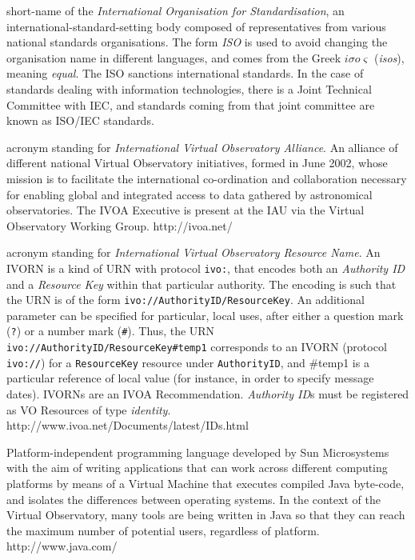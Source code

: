{
    	short-name of the \emph{International Organisation for
        Standardisation}, an international-standard-setting body
        composed of representatives from various national standards
        organisations. The form \emph{ISO} is used to avoid changing
        the organisation name in different languages, and comes from
        the Greek $i\sigma{}o\varsigma$ (\emph{isos}),
        meaning \emph{equal}. The ISO sanctions international
        standards. In the case of standards dealing with information
        technologies, there is a Joint Technical Committee with
        \gls{IEC}, and standards coming from that joint committee are
        known as ISO/IEC standards.
}

{
    	acronym standing for \emph{International Virtual Observatory
        Alliance}. An alliance of different national \gls{Virtual
        Observatory} initiatives, formed in June 2002, whose mission is
        to facilitate the international co-ordination and collaboration
        necessary for enabling global and integrated access to data
        gathered by astronomical observatories. The IVOA Executive is
        present at the \gls{IAU} via the Virtual Observatory Working
        Group. http://ivoa.net/
}

{
    	acronym standing for \emph{International Virtual Observatory
        Resource Name}. An IVORN is a kind of \gls{URN} with protocol
        \texttt{ivo:}, that encodes both an \emph{Authority ID} and a
        \emph{Resource Key} within that particular authority. The
        encoding is such that the URN is of the form
        \texttt{ivo://AuthorityID/ResourceKey}. An additional parameter
        can be specified for particular, local uses, after either a
        question mark (\texttt{?}) or a number mark (\texttt{#}). Thus,
        the URN \texttt{ivo://AuthorityID/ResourceKey#temp1}
        corresponds to an IVORN (protocol \texttt{ivo://}) for a
        \texttt{ResourceKey} resource under \texttt{AuthorityID}, and
        #temp1 is a particular reference of local value (for instance,
        in order to specify message dates). IVORNs are an \gls{IVOA
        Recommendation}. \emph{Authority ID}s must be registered as
        \gls{VO Resource}s of type \emph{identity}.
        http://www.ivoa.net/Documents/latest/IDs.html
}

{
    	Platform-independent programming language developed by Sun
        Microsystems with the aim of writing applications that can work
        across different computing platforms by means of a \gls{Virtual
        Machine} that executes compiled Java byte-code, and isolates
        the differences between operating systems. In the context of
        the \gls{Virtual Observatory}, many tools are being written in
        Java so that they can reach the maximum number of potential
        users, regardless of platform. http://www.java.com/
}

